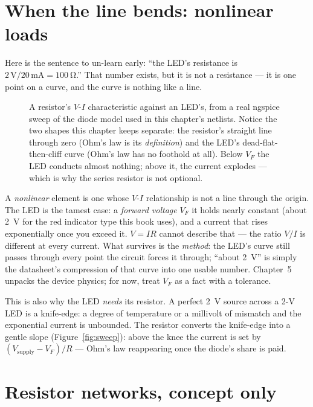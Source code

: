 \section{When the line bends: nonlinear loads}
\label{sec:nonlinear}

Here is the sentence to un-learn early: ``the LED's resistance is
$2\,\mathrm{V}/20\,\mathrm{mA} = \qty{100}{\ohm}$.'' That number exists, but
it is not a resistance — it is one point on a curve, and the curve is nothing
like a line.

\begin{figure}[htbp]
\centering

\caption{A resistor's $V$-$I$ characteristic against an LED's, from a real
ngspice sweep of the diode model used in this chapter's netlists. Notice the
two shapes this chapter keeps separate: the resistor's straight line through
zero (Ohm's law is its \emph{definition}) and the LED's dead-flat-then-cliff
curve (Ohm's law has no foothold at all). Below $V_F$ the LED conducts almost
nothing; above it, the current explodes — which is why the series resistor is
not optional.}
\label{fig:vi}
\end{figure}

A \emph{nonlinear} element is one whose $V$-$I$
relationship is not a line through the origin. The LED is the tamest case:
a \emph{forward voltage} $V_F$ it holds nearly
constant (about \qty{2}{\volt} for the red indicator type this book uses),
and a current that rises exponentially once you exceed it. $V=IR$ cannot
describe that — the ratio $V/I$ is different at every current. What survives
is the \emph{method}: the LED's curve still passes through every point the
circuit forces it through; ``about \qty{2}{\volt}'' is simply the datasheet's
compression of that curve into one usable number. Chapter~5 unpacks the
device physics; for now, treat $V_F$ as a fact with a tolerance.

\begin{remark}
This is also why the LED \emph{needs} its resistor. A perfect \qty{2}{\volt}
source across a 2-V LED is a knife-edge: a degree of temperature or a
millivolt of mismatch and the exponential current is unbounded. The resistor
converts the knife-edge into a gentle slope (Figure~\ref{fig:sweep}): above
the knee the current is set by $(V_{\mathrm{supply}}-V_F)/R$ — Ohm's law
reappearing once the diode's share is paid.
\end{remark}

\section{Resistor networks, concept only}
\label{sec:networks}

